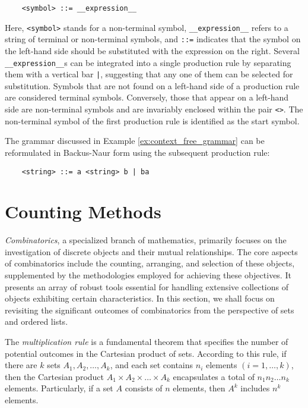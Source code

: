 \begin{verbatim}
    <symbol> ::= __expression__
\end{verbatim}

Here, \texttt{<symbol>} stands for a non-terminal symbol, \texttt{\_\_expression\_\_} refers to a string of terminal or non-terminal symbols, and \texttt{::=} indicates that the symbol on the left-hand side should be substituted with the expression on the right. Several \texttt{\_\_expression\_\_}s can be integrated into a single production rule by separating them with a vertical bar \texttt{|}, suggesting that any one of them can be selected for substitution. Symbols that are not found on a left-hand side of a production rule are considered terminal symbols. Conversely, those that appear on a left-hand side are non-terminal symbols and are invariably enclosed within the pair \texttt{<>}. The non-terminal symbol of the first production rule is identified as the start symbol.

\begin{example}
The grammar discussed in Example \ref{ex:context_free_grammar} can be reformulated in Backus-Naur form using the subsequent production rule:
\begin{verbatim}
    <string> ::= a <string> b | ba
\end{verbatim}
\end{example}

%
%

\section{Counting Methods}
\label{sec:counting}

\emph{Combinatorics}, a specialized branch of mathematics, primarily focuses on the investigation of discrete objects and their mutual relationships. The core aspects of combinatorics include the counting, arranging, and selection of these objects, supplemented by the methodologies employed for achieving these objectives. It presents an array of robust tools essential for handling extensive collections of objects exhibiting certain characteristics. In this section, we shall focus on revisiting the significant outcomes of combinatorics from the perspective of sets and ordered lists.

The \emph{multiplication rule} is a fundamental theorem that specifies the number of potential outcomes in the Cartesian product of sets. According to this rule, if there are $k$ sets $A_1, A_2, \ldots, A_k$, and each set contains $n_i$ elements $\left( i=1, \ldots, k \right)$, then the Cartesian product $A_1 \times A_2 \times \ldots \times A_k$ encapsulates a total of $n_1 n_2 \ldots n_k$ elements. Particularly, if a set $A$ consists of $n$ elements, then $A^k$ includes $n^k$ elements.

